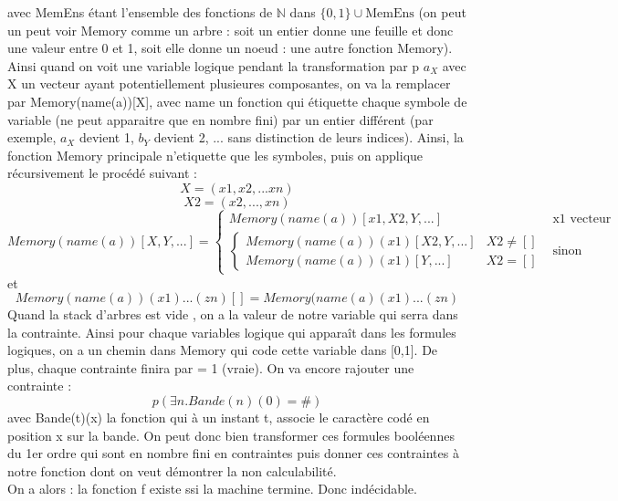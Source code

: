 \documentclass[12pt]{article}
\begin{document}
avec MemEns étant l'ensemble des fonctions de $\mathbb{N}$ dans $\{0,1\}\cup \text{MemEns}$ (on peut un peut voir Memory comme un arbre : soit un entier donne une feuille et donc une valeur entre 0 et 1, soit elle donne un noeud : une autre fonction Memory). Ainsi quand on voit une variable logique pendant la transformation par p $a_{X}$ avec X un vecteur ayant potentiellement plusieures composantes, on va la remplacer par Memory(name(a))[X], avec name un fonction qui étiquette chaque symbole de variable (ne peut apparaitre que en nombre fini) par un entier différent (par exemple, $a_X$ devient 1, $b_Y$ devient 2, ... sans distinction de leurs indices). Ainsi, la fonction Memory principale n'etiquette que les symboles, puis on applique récursivement le procédé suivant :
\[X = (x1,x2,...xn)\]
\[X2 = (x2,...,xn)\]
\[Memory(name(a))[X,Y,...] = 
\begin{cases}
	Memory(name(a))[x1,X2,Y,...] & \text{x1 vecteur} \\
	\begin{cases}
		Memory(name(a))(x1)[X2,Y,...] & X2 \neq []\\
		Memory(name(a))(x1)[Y,...] & X2 = []
	\end{cases} & \text{sinon}
\end{cases}
\]
et 
\[Memory(name(a))(x1)...(zn)[] = Memory(name(a)(x1)...(zn)\]
Quand la stack d'arbres est vide , on a la valeur de notre variable qui serra dans la contrainte. Ainsi pour chaque variables logique qui apparaît dans les formules logiques, on a un chemin dans Memory qui code cette variable dans [0,1]. De plus, chaque contrainte finira par = 1 (vraie). On va encore rajouter une contrainte : 
\[p(\exists n.Bande(n)(0)=\#)\]
avec Bande(t)(x) la fonction qui à un instant t, associe le caractère codé en position x sur la bande.
On peut donc bien transformer ces formules booléennes du 1er ordre qui sont en nombre fini en contraintes puis donner ces contraintes à notre fonction dont on veut démontrer la non calculabilité.\\
On a alors : la fonction f existe ssi la machine termine. Donc indécidable.
\end{document}
